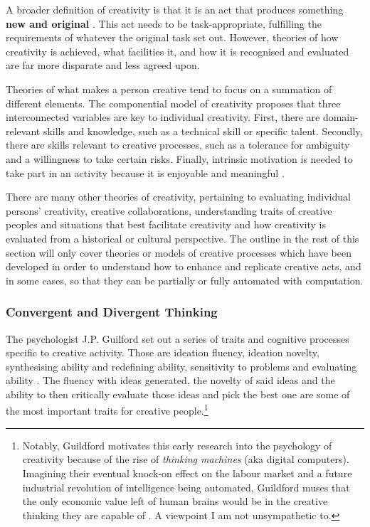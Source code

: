 A broader definition of creativity is that it is an act that produces something \textbf{new and original} \citep{kaufman2021overview}. This act needs to be task-appropriate, fulfilling the requirements of whatever the original task set out. 
However, theories of how creativity is achieved, what facilities it, and how it is recognised and evaluated are far more disparate and less agreed upon. 

Theories of what makes a person creative tend to focus on a summation of different elements.
The componential model of creativity proposes that three interconnected variables are key to individual creativity.
First, there are domain-relevant skills and knowledge, such as a technical skill or specific talent.
Secondly, there are skills relevant to creative processes, such as a tolerance for ambiguity and a willingness to take certain risks.
Finally, intrinsic motivation is needed to take part in an activity because it is enjoyable and meaningful \citep{amabile1983social}.

There are many other theories of creativity, pertaining to evaluating individual persons' creativity, creative collaborations, understanding traits of creative peoples and situations that best facilitate creativity and how creativity is evaluated from a historical or cultural perspective. 
The outline in the rest of this section will only cover theories or models of creative processes which have been developed in order to understand how to enhance and replicate creative acts, and in some cases, so that they can be partially or fully automated with computation.

\subsubsection{Convergent and Divergent Thinking}

The psychologist J.P. Guilford set out a series of traits and cognitive processes specific to creative activity. Those are ideation fluency, ideation novelty, synthesising ability and redefining ability, sensitivity to problems and evaluating ability \citep{guilford1950creativity}. 
The fluency with ideas generated, the novelty of said ideas and the ability to then critically evaluate those ideas and pick the best one are some of the most important traits for creative people.\footnote{Notably, Guildford motivates this early research into the psychology of creativity because of the rise of \textit{thinking machines} (aka digital computers). Imagining their eventual knock-on effect on the labour market and a future industrial revolution of intelligence being automated, Guildford muses that the only economic value left of human brains would be in the creative thinking they are capable of \citep{guilford1950creativity}. A viewpoint I am not unsympathetic to.}

